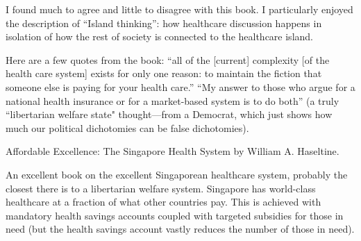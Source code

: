 I found much to agree and little to disagree with this book. I particularly
enjoyed the description of ``Island thinking'': how healthcare discussion
happens in isolation of how the rest of society is connected to the healthcare
island.

Here are a few quotes from the book: ``all of the [current] complexity [of the
health care system] exists for only one reason: to maintain the fiction that
someone else is paying for your health care.'' ``My answer to those who argue
for a national health insurance or for a market-based system is to do both'' (a
truly ``libertarian welfare state" thought---from a Democrat, which just shows
how much our political dichotomies can be false dichotomies).

\book Affordable Excellence: The Singapore Health System by William A. Haseltine.

An excellent book on the excellent Singaporean healthcare system, probably the
closest there is to a libertarian welfare system. Singapore has world-class
healthcare at a fraction of what other countries pay. This is achieved with
mandatory health savings accounts coupled with targeted subsidies for those in
need (but the health savings account vastly reduces the number of those in
need).

